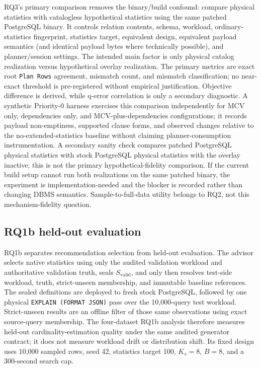 RQ3's primary comparison removes the binary/build confound: compare physical
statistics with catalogless hypothetical statistics using the same patched
PostgreSQL binary. It controls relation contents, schema, workload, ordinary-
statistics fingerprint, statistics target, equivalent design, equivalent
payload semantics (and identical payload bytes where technically possible),
and planner/session settings. The intended main factor is only physical
catalog realization versus hypothetical overlay realization. The primary
metrics are exact root \texttt{Plan Rows} agreement, mismatch count, and
mismatch classification; no near-exact threshold is pre-registered without
empirical justification. Objective difference is derived, while q-error
correlation is only a secondary diagnostic. A
synthetic Priority-0 harness exercises this comparison independently for MCV
only, dependencies only, and MCV-plus-dependencies configurations; it records
payload non-emptiness, supported clause forms, and observed changes relative to
the no-extended-statistics baseline without claiming planner-consumption
instrumentation. A
secondary sanity check compares patched PostgreSQL physical statistics with
stock PostgreSQL physical statistics with the overlay inactive; this is not
the primary hypothetical-fidelity comparison. If the current build setup
cannot run both realizations on the same patched binary, the experiment is
implementation-needed and the blocker is recorded rather than changing DBMS
	semantics. Sample-to-full-data utility belongs to RQ2, not this
mechanism-fidelity question.

\subsection{RQ1b held-out evaluation}
RQ1b separates recommendation selection from held-out evaluation. The
advisor selects native statistics using only the audited validation workload
and authoritative validation truth, seals $S_{\mathrm{valid}}$, and only then
resolves test-side workload, truth, strict-unseen membership, and immutable
baseline references. The sealed definitions are deployed to fresh stock
PostgreSQL, followed by one physical \texttt{EXPLAIN (FORMAT JSON)} pass over
the 10,000-query test workload. Strict-unseen results are an offline filter of
those same observations using exact source-query membership. The four-dataset
RQ1b analysis therefore measures held-out cardinality-estimation quality under
the same audited generator contract; it does not measure workload drift or
distribution shift. Its fixed design uses 10,000 sampled rows, seed 42,
statistics target 100, $K_s=8$, $B=8$, and a 300-second search cap.


